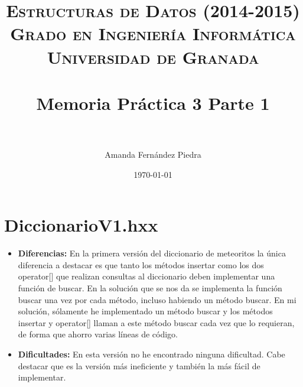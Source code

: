


\title{	
\normalfont \normalsize 
\textsc{{\bf Estructuras de Datos (2014-2015)} \\ Grado en Ingeniería Informática \\ Universidad de Granada} \\ [25pt] %
\horrule{0.5pt} \\[0.4cm] %
\huge Memoria Práctica 3 Parte 1\\ %
\horrule{2pt} \\[0.5cm] %
}
\usepackage[spanish]{babel}
\author{Amanda Fernández Piedra} %
\usepackage[utf8]{inputenc}
\date{\normalsize\today} %




\maketitle %

\newpage %




\newpage

\newpage

\section{DiccionarioV1.hxx}

\begin{itemize}

\item \textbf{Diferencias:} En la primera versión del diccionario de meteoritos la única diferencia a destacar es que tanto los métodos insertar como los dos operator[] que realizan consultas al diccionario deben implementar una función de buscar. En la solución que se nos da se implementa la función buscar una vez por cada método, incluso habiendo un método buscar. En mi solución, sólamente he implementado un método buscar y los métodos insertar y operator[] llaman a este método buscar cada vez que lo requieran, de forma que ahorro varias líneas de código.
\item \textbf{Dificultades:} En esta versión no he encontrado ninguna dificultad. Cabe destacar que es la versión más ineficiente y también la más fácil de implementar.

\end{itemize}

